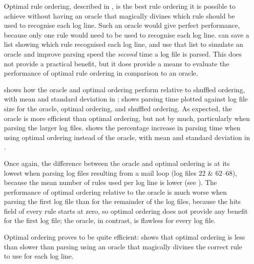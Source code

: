 \label{perfect rule ordering}

Optimal rule ordering, described in , is the best rule ordering it is possible to achieve without
having an oracle that magically divines which rule should be used to
recognise each log line.  Such an oracle would give perfect performance,
because only one rule would need to be used to recognise each log line.
\parsername{} can save a list showing which rule recognised each log line,
and use that list to simulate an oracle and improve parsing speed the
\textit{second\/} time a log file is parsed.  This does not provide a
practical benefit, but it does provide a means to evaluate the performance
of optimal rule ordering in comparison to an oracle.

 shows how the oracle and optimal ordering perform
relative to shuffled ordering, with mean and standard deviation in
;  shows parsing
time plotted against log file size for the oracle, optimal ordering, and
shuffled ordering.  As expected, the oracle is more efficient than optimal
ordering, but not by much, particularly when parsing the larger log files.
 shows the percentage increase in parsing time
when using optimal ordering instead of the oracle, with mean and standard
deviation in .

Once again, the difference between the oracle and optimal ordering is at
its lowest when parsing log files resulting from a mail loop (log files 22
\& 62--68), because the mean number of rules used per log line is lower
(see ).  The performance
of optimal ordering relative to the oracle is much worse when parsing the
first log file than for the remainder of the log files, because the hits
field of every rule starts at zero, so optimal ordering does not provide
any benefit for the first log file; the oracle, in contrast, is flawless
for every log file.

Optimal ordering proves to be quite efficient:  shows that optimal ordering is less than
 slower than parsing
using an oracle that magically divines the correct rule to use for each log
line.

